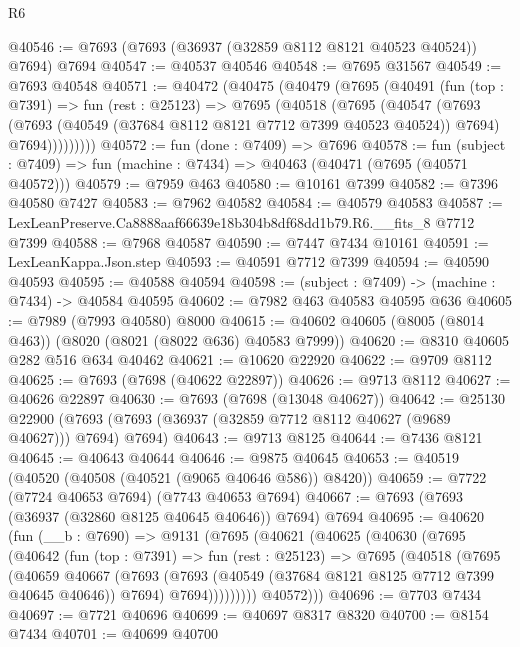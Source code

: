 \begin{lexlean}{R6}
\begin{coremodule}
@40546 := @7693 (@7693 (@36937 (@32859 @8112 @8121 @40523 @40524)) @7694) @7694
@40547 := @40537 @40546
@40548 := @7695 @31567
@40549 := @7693 @40548
@40571 := @40472
    (@40475
      (@40479
        (@7695
          (@40491
            (fun (top : @7391) =>
            fun (rest : @25123) =>
            @7695
              (@40518
                (@7695
                  (@40547
                    (@7693
                      (@7693 (@40549 (@37684 @8112 @8121 @7712 @7399 @40523 @40524)) @7694)
                      @7694)))))))))
@40572 := fun (done : @7409) => @7696
@40578 := fun (subject : @7409) => fun (machine : @7434) => @40463 (@40471 (@7695 (@40571 @40572)))
@40579 := @7959 @463
@40580 := @10161 @7399
@40582 := @7396 @40580 @7427
@40583 := @7962 @40582
@40584 := @40579 @40583
@40587 := LexLeanPreserve.Ca8888aaf66639e18b304b8df68dd1b79.R6.__fits_8 @7712 @7399
@40588 := @7968 @40587
@40590 := @7447 @7434 @10161
@40591 := LexLeanKappa.Json.step
@40593 := @40591 @7712 @7399
@40594 := @40590 @40593
@40595 := @40588 @40594
@40598 := (subject : @7409) -> (machine : @7434) -> @40584 @40595
@40602 := @7982 @463 @40583 @40595 @636
@40605 := @7989 (@7993 @40580) @8000
@40615 := @40602 @40605 (@8005 (@8014 @463)) (@8020 (@8021 (@8022 @636) @40583 @7999))
@40620 := @8310 @40605 @282 @516 @634 @40462
@40621 := @10620 @22920
@40622 := @9709 @8112
@40625 := @7693 (@7698 (@40622 @22897))
@40626 := @9713 @8112
@40627 := @40626 @22897
@40630 := @7693 (@7698 (@13048 @40627))
@40642 := @25130
    @22900
    (@7693 (@7693 (@36937 (@32859 @7712 @8112 @40627 (@9689 @40627))) @7694) @7694)
@40643 := @9713 @8125
@40644 := @7436 @8121
@40645 := @40643 @40644
@40646 := @9875 @40645
@40653 := @40519 (@40520 (@40508 (@40521 (@9065 @40646 @586)) @8420))
@40659 := @7722 (@7724 @40653 @7694) (@7743 @40653 @7694)
@40667 := @7693 (@7693 (@36937 (@32860 @8125 @40645 @40646)) @7694) @7694
@40695 := @40620
    (fun (__b : @7690) =>
    @9131
      (@7695
        (@40621
          (@40625
            (@40630
              (@7695
                (@40642
                  (fun (top : @7391) =>
                  fun (rest : @25123) =>
                  @7695
                    (@40518
                      (@7695
                        (@40659
                          @40667
                          (@7693
                            (@7693 (@40549 (@37684 @8121 @8125 @7712 @7399 @40645 @40646)) @7694)
                            @7694)))))))))
          @40572)))
@40696 := @7703 @7434
@40697 := @7721 @40696
@40699 := @40697 @8317 @8320
@40700 := @8154 @7434
@40701 := @40699 @40700

\end{coremodule}
\end{lexlean}
